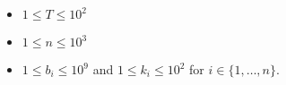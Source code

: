 \begin{itemize}
\tightlist
\item $1 \le T \le 10^2$
\item $1 \le n \le 10^3$
\item $1 \le b_i \le 10^9$ and $1 \le k_i \le 10^2$ for $i\in\{1,\dots,n\}$.
\end{itemize}

